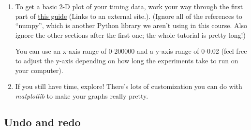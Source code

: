 \documentclass[12pt]{article}
\begin{document}
\begin{enumerate}[1.]
\begin{mdframed}
    \end{mdframed}

    \item To get a basic 2-D plot of your timing data, work your way through the
    first part of \href{https://matplotlib.org/users/pyplot_tutorial.html}{this guide} (Links to an external site.). (Ignore all of the
    references to “numpy”, which is another Python library we aren’t using in this
    course. Also ignore the other sections after the first one; the whole tutorial
    is pretty long!)

    \bigskip

    You can use an x-axis range of 0-200000 and a y-axis range of 0-0.02 (feel
    free to adjust the y-axis depending on how long the experiments take to run
    on your computer).

    \item If you still have time, explore! There’s lots of customization you can
    do with \textit{matplotlib} to make your graphs really pretty.
\end{enumerate}

\subsection*{Undo and redo}
\end{document}
